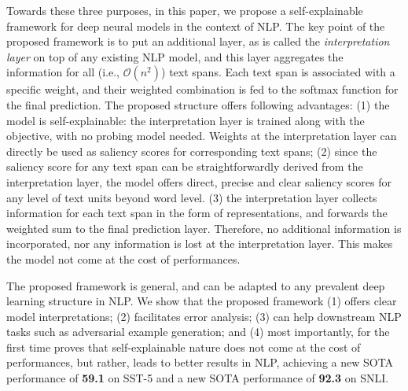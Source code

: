 \documentclass[11pt,a4paper]{article}
\begin{document}
Towards these three purposes, in this paper, we propose a self-explainable framework for deep neural models in the context of NLP. 
The key point of the proposed framework is to put an additional layer, as is called the {\it interpretation layer} on top of any existing NLP model,  
and this layer aggregates the information for all  (i.e., $\mathcal{O}(n^2)$) text spans. 
Each text span is  associated with a specific weight, and their weighted combination is fed to the softmax function for the final prediction. 
The proposed 
 structure offers  following advantages:
(1) the model is self-explainable: 
the interpretation layer is trained along with the objective, with no  probing model needed. 
 Weights at the interpretation layer can directly be used as saliency scores for  corresponding text spans; 
(2) since the saliency score for any text span can be straightforwardly derived from the interpretation layer,  
the model offers direct,  precise and clear saliency scores for any  level of text units beyond word level. 
 (3) the interpretation layer collects information for each text span in the form of representations, and forwards the weighted sum to the final prediction layer. 
Therefore, no additional information is incorporated, nor any information is lost at the interpretation layer. This makes the model not come at the cost of performances. 

The proposed framework is general, and can be adapted to any prevalent deep learning structure in NLP.
We show that the proposed framework (1) offers clear model interpretations; 
(2) facilitates error analysis; 
(3) can help   downstream NLP tasks such as adversarial example generation; and 
(4) most importantly, for the first time proves that self-explainable nature does not come at the cost of performances, but rather, 
leads to better results in NLP,  
 achieving a new SOTA performance of {\bf 59.1} on SST-5 and 
  a new SOTA performance of {\bf 92.3} 
 on SNLI.


\begin{comment}
The rest of this work is organized as follows: related work is detailed in Section 2.
The proposed self-explaining framework is illustrated in Section 3.
Evaluation methods and experimental results are respectively shown in Section 4 and 5, followed by a brief conclusion in Section 6. 
\end{comment}
\end{document}
